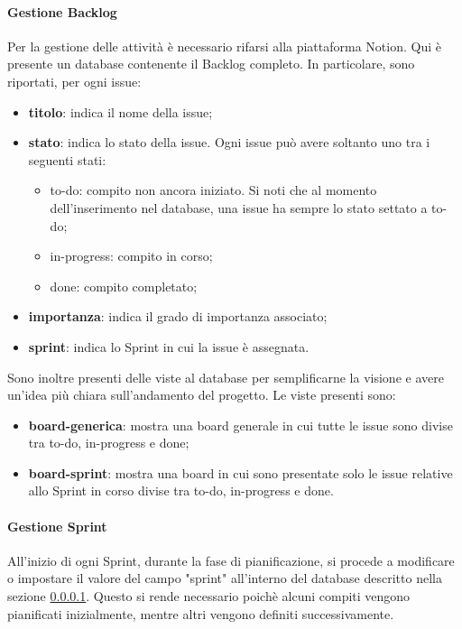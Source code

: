         \paragraph{Gestione Backlog} \label{sec:gestione-backlog}
        Per la gestione delle attività è necessario rifarsi alla piattaforma Notion.
        Qui è presente un database contenente il Backlog completo. 
        In particolare, sono riportati, per ogni issue:
        \begin{itemize}
            \item \textbf{titolo}: indica il nome della issue;
            \item \textbf{stato}: indica lo stato della issue. Ogni issue può avere soltanto uno tra i seguenti stati: 
            \begin{itemize}
                \item to-do: compito non ancora iniziato. Si noti che al momento dell'inserimento nel database, una issue ha sempre lo stato settato a to-do;
                \item in-progress: compito in corso;
                \item done: compito completato;
            \end{itemize}
            \item \textbf{importanza}: indica il grado di importanza associato;
            \item \textbf{sprint}: indica lo Sprint in cui la issue è assegnata. 
        \end{itemize} 

        \vspace{0.3cm}
        \noindent
        Sono inoltre presenti delle viste al database per semplificarne la visione e avere un'idea più chiara sull'andamento del progetto. Le viste presenti sono:
        \begin{itemize}
            \item \textbf{board-generica}: mostra una board generale in cui tutte le issue sono divise tra to-do, in-progress e done;
            \item \textbf{board-sprint}: mostra una board in cui sono presentate solo le issue relative allo Sprint in corso divise tra to-do, in-progress e done.
        \end{itemize}

        \paragraph{Gestione Sprint} \label{sec:gestione-sprint}
        All'inizio di ogni Sprint, durante la fase di pianificazione, si procede a modificare o impostare il valore del campo "sprint" all'interno del database descritto nella sezione \ref{sec:gestione-backlog}. Questo si rende necessario poichè alcuni compiti vengono pianificati inizialmente, mentre altri vengono definiti successivamente.
        
